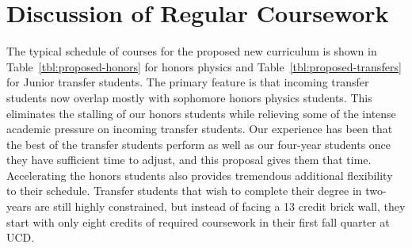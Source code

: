 \documentclass[12pt]{article}
\begin{document}
\newpage
\section{Discussion of Regular Coursework}

The typical schedule of courses for the proposed new curriculum is shown in Table~\ref{tbl:proposed-honors} for honors physics and Table~\ref{tbl:proposed-transfers} for Junior transfer students.
The primary feature is that incoming transfer students now overlap mostly with sophomore honors physics students.  This eliminates the stalling of our honors students while relieving some of the intense academic pressure on incoming transfer students.  Our experience has been that the best of the transfer students perform as well as our four-year students once they have sufficient time to adjust, and this proposal gives them that time.  Accelerating the honors students also provides tremendous additional flexibility to their schedule.  Transfer students that wish to complete their degree in two-years are still highly constrained, but instead of facing a 13 credit brick wall, they start with only eight credits of required coursework in their first fall quarter at UCD.
\end{document}
